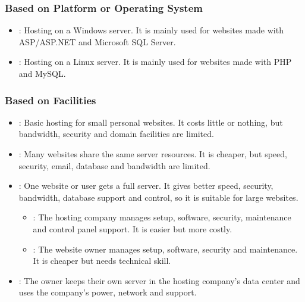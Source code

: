 \subsubsection{Based on Platform or Operating System}

\begin{itemize}
    \item {}: Hosting on a Windows server. It is mainly used for websites made with ASP/ASP.NET and Microsoft SQL Server.
    
    \item {}: Hosting on a Linux server. It is mainly used for websites made with PHP and MySQL.
\end{itemize}

\subsubsection{Based on Facilities}

\begin{itemize}
    \item {}: Basic hosting for small personal websites. It costs little or nothing, but bandwidth, security and domain facilities are limited.
    
    \item {}: Many websites share the same server resources. It is cheaper, but speed, security, email, database and bandwidth are limited.
    
    \item {}: One website or user gets a full server. It gives better speed, security, bandwidth, database support and control, so it is suitable for large websites.
    
    \begin{itemize}
        \item {}: The hosting company manages setup, software, security, maintenance and control panel support. It is easier but more costly.
        \item {}: The website owner manages setup, software, security and maintenance. It is cheaper but needs technical skill.
    \end{itemize}
    
    \item {}: The owner keeps their own server in the hosting company's data center and uses the company's power, network and support.
\end{itemize}

